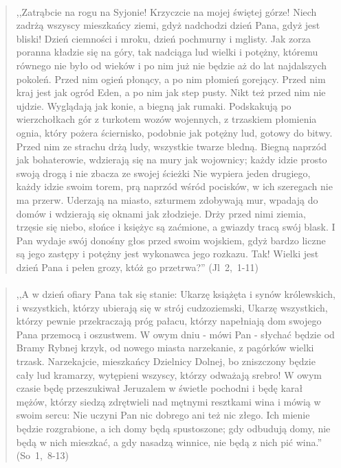 \documentclass[10pt,a4paper,oneside]{article}
\begin{document}
\paragraph{}
\begin{quote}
,,Zatrąbcie na rogu na Syjonie! Krzyczcie na mojej świętej górze! Niech zadrżą wszyscy mieszkańcy ziemi, gdyż nadchodzi dzień Pana, gdyż jest bliski! Dzień ciemności i mroku, dzień pochmurny i mglisty. Jak zorza poranna kładzie się na góry, tak nadciąga lud wielki i potężny, któremu równego nie było od wieków i po nim już nie będzie aż do lat najdalszych pokoleń. Przed nim ogień płonący, a po nim płomień gorejący. Przed nim kraj jest jak ogród Eden, a po nim jak step pusty. Nikt też przed nim nie ujdzie. Wyglądają jak konie, a biegną jak rumaki. Podskakują po wierzchołkach gór z turkotem wozów wojennych, z trzaskiem płomienia ognia, który pożera ściernisko, podobnie jak potężny lud, gotowy do bitwy. Przed nim ze strachu drżą ludy, wszystkie twarze bledną. Biegną naprzód jak bohaterowie, wdzierają się na mury jak wojownicy; każdy idzie prosto swoją drogą i nie zbacza ze swojej ścieżki Nie wypiera jeden drugiego, każdy idzie swoim torem, prą naprzód wśród pocisków, w ich szeregach nie ma przerw. Uderzają na miasto, szturmem zdobywają mur, wpadają do domów i wdzierają się oknami jak złodzieje. Drży przed nimi ziemia, trzęsie się niebo, słońce i księżyc są zaćmione, a gwiazdy tracą swój blask. I Pan wydaje swój donośny głos przed swoim wojskiem, gdyż bardzo liczne są jego zastępy i potężny jest wykonawca jego rozkazu. Tak! Wielki jest dzień Pana i pełen grozy, któż go przetrwa?'' \mbox{(Jl 2, 1-11)}
\end{quote}
\paragraph{}
\begin{quote}
,,A w dzień ofiary Pana tak się stanie: Ukarzę książęta i synów królewskich, i wszystkich, którzy ubierają się w strój cudzoziemski, Ukarzę wszystkich, którzy pewnie przekraczają próg pałacu, którzy napełniają dom swojego Pana przemocą i oszustwem. W owym dniu - mówi Pan - słychać będzie od Bramy Rybnej krzyk, od nowego miasta narzekanie, z pagórków wielki trzask. Narzekajcie, mieszkańcy Dzielnicy Dolnej, bo zniszczony będzie cały lud kramarzy, wytępieni wszyscy, którzy odważają srebro! W owym czasie będę przeszukiwał Jeruzalem w świetle pochodni i będę karał mężów, którzy siedzą zdrętwieli nad mętnymi resztkami wina i mówią w swoim sercu: Nie uczyni Pan nic dobrego ani też nic złego. Ich mienie będzie rozgrabione, a ich domy będą spustoszone; gdy odbudują domy, nie będą w nich mieszkać, a gdy nasadzą winnice, nie będą z nich pić wina.'' \mbox{(So 1, 8-13)}
\end{quote}
\end{document}
